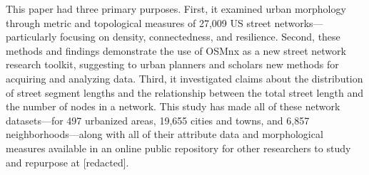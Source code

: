 \documentclass[Afour,sageh,times]{sagej}
\begin{document}
This paper had three primary purposes. First, it examined urban morphology through metric and topological measures of 27,009 US street networks---particularly focusing on density, connectedness, and resilience. Second, these methods and findings demonstrate the use of OSMnx as a new street network research toolkit, suggesting to urban planners and scholars new methods for acquiring and analyzing data. Third, it investigated claims about the distribution of street segment lengths and the relationship between the total street length and the number of nodes in a network. This study has made all of these network datasets---for 497 urbanized areas, 19,655 cities and towns, and 6,857 neighborhoods---along with all of their attribute data and morphological measures available in an online public repository for other researchers to study and repurpose at [redacted].
\end{document}
